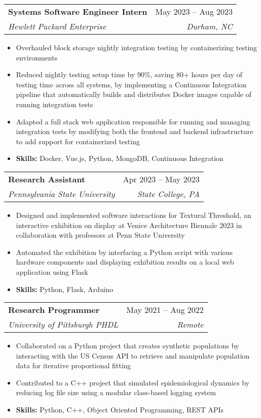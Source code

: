 \documentclass[letterpaper,11pt]{article}
\makeatletter
\newcommand{\resumeItem}[1]{
  \item\small{
    {#1 \vspace{-2pt}}
  }
}
\newcommand{\resumeSubheading}[4]{
  \vspace{-2pt}\item
    \begin{tabular*}{0.97\textwidth}[t]{l@{\extracolsep{\fill}}r}
      \textbf{#1} & #2 \\
      \textit{\small#3} & \textit{\small #4} \\
    \end{tabular*}\vspace{-7pt}
}
\newcommand{\resumeSubSubheading}[2]{
    \item
    \begin{tabular*}{0.97\textwidth}{l@{\extracolsep{\fill}}r}
      \textit{\small#1} & \textit{\small #2} \\
    \end{tabular*}\vspace{-7pt}
}
\newcommand{\resumeSubHeadingListEnd}{\end{itemize}}
\newcommand{\resumeItemListStart}{\begin{itemize}}
\newcommand{\resumeItemListEnd}{\end{itemize}\vspace{-5pt}}
\makeatother
\begin{document}

    \resumeSubheading
      {Systems Software Engineer Intern}{May 2023 -- Aug 2023}
      {Hewlett Packard Enterprise}{Durham, NC}
      \resumeItemListStart
        \resumeItem{Overhauled block storage nightly integration testing by containerizing testing environments}
        \resumeItem{Reduced nightly testing setup time by 90\%, saving 80+ hours per day of testing time across all systems, by implementing a Continuous Integration pipeline that automatically builds and distributes Docker images capable of running integration tests}
        \resumeItem{Adapted a full stack web application responsible for running and managing integration tests by modifying both the frontend and backend infrastructure to add support for containerized testing}
        \resumeItem{{\bf Skills:} Docker, Vue.js, Python, MongoDB, Continuous Integration}
    \resumeItemListEnd

    \resumeSubheading
      {Research Assistant}{Apr 2023 -- May 2023}
      {Pennsylvania State University}{State College, PA}
      \resumeItemListStart
        \resumeItem{Designed and implemented software interactions for Textural Threshold, an interactive exhibition on display at Venice Architecture Biennale 2023 in collaboration with professors at Penn State University}
        \resumeItem{Automated the exhibition by interfacing a Python script with various hardware components and displaying exhibition results on a local web application using Flask}
        \resumeItem{{\bf Skills:} Python, Flask, Arduino}
    \resumeItemListEnd

    \resumeSubheading
      {Research Programmer}{May 2021 -- Aug 2022}
      {University of Pittsburgh PHDL}{Remote}
      \resumeItemListStart
        \resumeItem{Collaborated on a Python project that creates synthetic populations by interacting with the US Census API to retrieve and manipulate population data for iterative proportional fitting}
        \resumeItem{Contributed to a C++ project that simulated epidemiological dynamics by reducing log file size using a modular class-based logging system}
        \resumeItem{{\bf Skills:} Python, C++, Object Oriented Programming, REST APIs}
      \resumeItemListEnd
\end{document}
